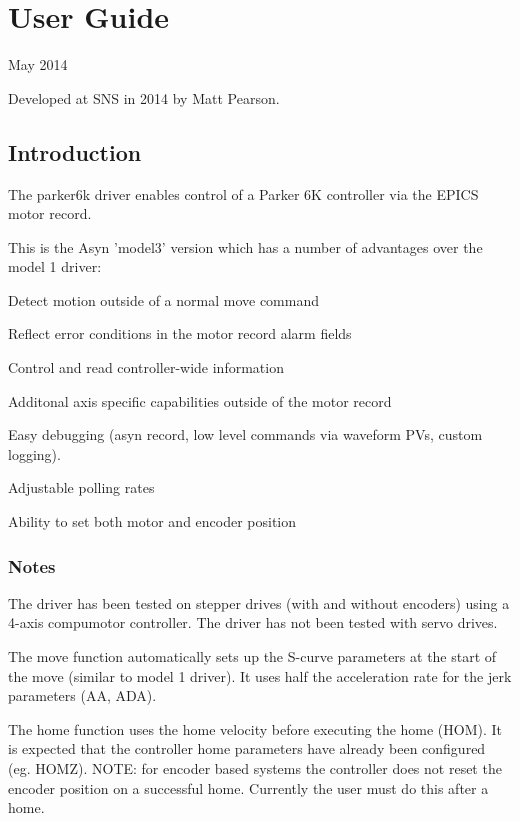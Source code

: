 \hypertarget{index_user}{}\section{User Guide}\label{index_user}
May 2014

Developed at SNS in 2014 by Matt Pearson.\hypertarget{index_intro}{}\subsection{Introduction}\label{index_intro}
The parker6k driver enables control of a Parker 6K controller via the EPICS motor record.

This is the Asyn 'model3' version which has a number of advantages over the model 1 driver:


\begin{DoxyItemize}
\item Detect motion outside of a normal move command 
\item Reflect error conditions in the motor record alarm fields 
\item Control and read controller-\/wide information 
\item Additonal axis specific capabilities outside of the motor record 
\item Easy debugging (asyn record, low level commands via waveform PVs, custom logging). 
\item Adjustable polling rates 
\item Ability to set both motor and encoder position 
\end{DoxyItemize}\hypertarget{index_notes}{}\subsubsection{Notes}\label{index_notes}
The driver has been tested on stepper drives (with and without encoders) using a 4-\/axis compumotor controller. The driver has not been tested with servo drives.

The move function automatically sets up the S-\/curve parameters at the start of the move (similar to model 1 driver). It uses half the acceleration rate for the jerk parameters (AA, ADA).

The home function uses the home velocity before executing the home (HOM). It is expected that the controller home parameters have already been configured (eg. HOMZ). NOTE: for encoder based systems the controller does not reset the encoder position on a successful home. Currently the user must do this after a home.

